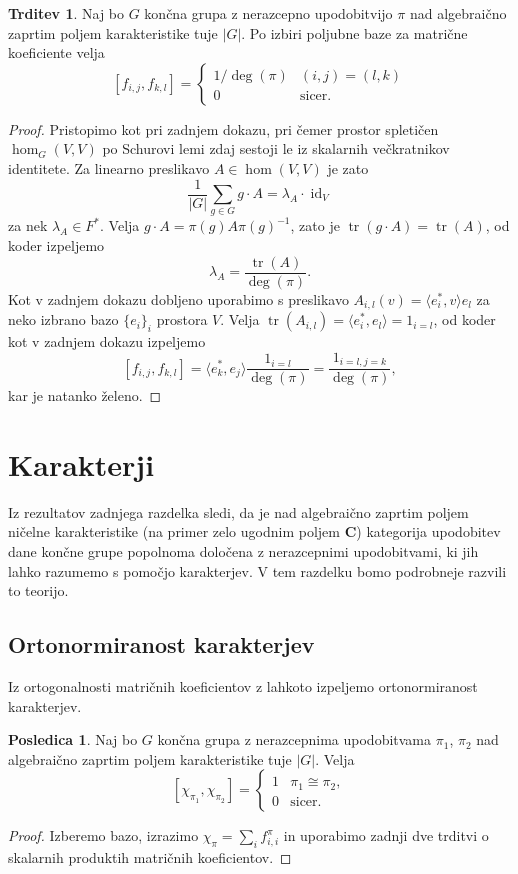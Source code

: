 \documentclass[11pt]{book}
\def\CC{\mathbf{C}}
\DeclareMathOperator\tr{tr}
\DeclareMathOperator\id{id}
\theoremstyle{definition}
\theoremstyle{zgled}
\theoremstyle{odprtproblem}
\theoremstyle{domacanaloga}
\newenvironment{dokaz}
    {\color{siva}\begin{proof}}
    {\end{proof}}
\theoremstyle{izrek}
\newtheorem*{trditev}{Trditev}
\newtheorem*{posledica}{Posledica}
\begin{document}
\begin{trditev}
Naj bo $G$ končna grupa z nerazcepno upodobitvijo $\pi$ nad algebraično zaprtim poljem karakteristike tuje $|G|$. Po izbiri poljubne baze za matrične koeficiente velja
\[
    [ f_{i,j}, f_{k,l} ] = 
    \begin{cases}
        1/\deg(\pi) & (i,j) = (l,k) \\
        0 & \text{sicer.}
    \end{cases}
\]
\end{trditev}
\begin{dokaz}
Pristopimo kot pri zadnjem dokazu, pri čemer prostor spletičen $\hom_G(V,V)$ po Schurovi lemi zdaj sestoji le iz skalarnih večkratnikov identitete. Za linearno preslikavo $A \in \hom(V,V)$ je zato
\[
    \frac{1}{|G|} \sum_{g \in G} g \cdot A = \lambda_A \cdot \id_V
\]
za nek $\lambda_A \in F^*$. Velja $g \cdot A = \pi(g) A \pi(g)^{-1}
$, zato je $\tr(g \cdot A) = \tr(A)$, od koder izpeljemo
\[
    \lambda_A = \frac{\tr(A)}{\deg(\pi)}.
\]
Kot v zadnjem dokazu dobljeno uporabimo s preslikavo $A_{i,l}(v) = \langle e_i^*, v \rangle e_l$ za neko izbrano bazo $\{ e_i \}_i$ prostora $V$. Velja $\tr(A_{i,l}) = \langle e_i^*, e_l \rangle = 1_{i = l}$, od koder kot v zadnjem dokazu izpeljemo
\[
    [ f_{i,j}, f_{k,l} ] = \langle e_k^*, e_j \rangle \frac{1_{i = l}}{\deg(\pi)} = \frac{1_{i = l, j = k}}{\deg(\pi)},
\]
kar je natanko želeno.
\end{dokaz}

\section{Karakterji}

Iz rezultatov zadnjega razdelka sledi, da je nad algebraično zaprtim poljem ničelne karakteristike (na primer zelo ugodnim poljem $\CC$) kategorija upodobitev dane končne grupe popolnoma določena z nerazcepnimi upodobitvami, ki jih lahko razumemo s pomočjo karakterjev. V tem razdelku bomo podrobneje razvili to teorijo.

\subsection{Ortonormiranost karakterjev}

Iz ortogonalnosti matričnih koeficientov z lahkoto izpeljemo ortonormiranost karakterjev.

\begin{posledica}
Naj bo $G$ končna grupa z nerazcepnima upodobitvama $\pi_1$, $\pi_2$ nad algebraično zaprtim poljem karakteristike tuje $|G|$. Velja
\[
    [ \chi_{\pi_1}, \chi_{\pi_2} ] =
    \begin{cases}
        1 & \pi_1 \cong \pi_2, \\
        0 & \text{sicer.}
    \end{cases}
\]
\end{posledica}
\begin{dokaz}
Izberemo bazo, izrazimo $\chi_{\pi} = \sum_i f_{i,i}^{\pi}$ in uporabimo zadnji dve trditvi o skalarnih produktih matričnih koeficientov.
\end{dokaz}
\end{document}
